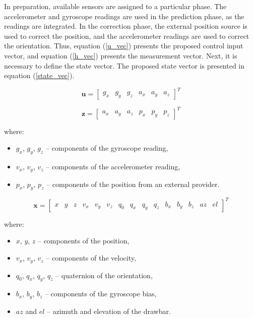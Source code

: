 In preparation, available sensors are assigned to a particular phase. The accelerometer and gyroscope readings are used in the prediction phase, as the readings are integrated. In the correction phase, the external position source is used to correct the position, and the accelerometer readings are used to correct the orientation. Thus, equation (\ref{u_vec}) presents the proposed control input vector, and equation (\ref{h_vec}) presents the measurement vector. Next, it is necessary to define the state vector. The proposed state vector is presented in equation (\ref{state_vec}).

\begin{equation}
	\bm{u} = \begin{bmatrix}
		g_x & g_y & g_z & a_x & a_y & a_z
	\end{bmatrix}^T
	\label{u_vec}
\end{equation}

\begin{equation}
	\bm{z} = \begin{bmatrix}
		a_x & a_y & a_z & p_x & p_y & p_z
	\end{bmatrix}^T
	\label{h_vec}
\end{equation}

where:
\begin{itemize}
	\item $g_x$, $g_y$, $g_z$ -- components of the gyroscope reading,
	\item $v_x$, $v_y$, $v_z$ -- components of the accelerometer reading,
	\item $p_x$, $p_y$, $p_z$ -- components of the position from an external provider.
\end{itemize}

\begin{equation}
	\bm{x} = \begin{bmatrix}
	x & y & z & v_x & v_y & v_z & q_0 & q_x & q_y & q_z & b_x & b_y & b_z & az & el
	\end{bmatrix}^T
	\label{state_vec}
\end{equation}

where:
\begin{itemize}
	\item $x$, $y$, $z$ -- components of the position,
	\item $v_x$, $v_y$, $v_z$ -- components of the velocity,
	\item $q_0$, $q_x$, $q_y$, $q_z$ -- quaternion of the orientation,
	\item $b_x$, $b_y$, $b_z$ -- components of the gyroscope bias,
	\item $az$ and $el$ -- azimuth and elevation of the drawbar.
\end{itemize}

